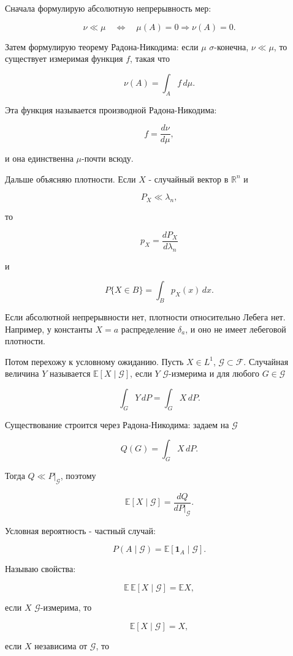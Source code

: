 \documentclass[
  11pt,
  a4paper,
]{article}
\begin{document}
Сначала формулирую абсолютную непрерывность мер:

\[
\nu\ll\mu
\quad\Longleftrightarrow\quad
\mu(A)=0\Rightarrow\nu(A)=0.
\]

Затем формулирую теорему Радона-Никодима: если \(\mu\)
\(\sigma\)-конечна, \(\nu\ll\mu\), то существует измеримая функция
\(f\), такая что

\[
\nu(A)=\int_A f\,d\mu.
\]

Эта функция называется производной Радона-Никодима:

\[
f=\frac{d\nu}{d\mu},
\]

и она единственна \(\mu\)-почти всюду.

Дальше объясняю плотности. Если \(X\) - случайный вектор в
\(\mathbb R^n\) и

\[
P_X\ll\lambda_n,
\]

то

\[
p_X=\frac{dP_X}{d\lambda_n}
\]

и

\[
P\{X\in B\}=\int_Bp_X(x)\,dx.
\]

Если абсолютной непрерывности нет, плотности относительно Лебега нет.
Например, у константы \(X=a\) распределение \(\delta_a\), и оно не имеет
лебеговой плотности.

Потом перехожу к условному ожиданию. Пусть \(X\in L^1\),
\(\mathcal G\subset\mathcal F\). Случайная величина \(Y\) называется
\(\mathbb E[X\mid\mathcal G]\), если \(Y\) \(\mathcal G\)-измерима и для
любого \(G\in\mathcal G\)

\[
\int_GY\,dP=\int_GX\,dP.
\]

Существование строится через Радона-Никодима: задаем на \(\mathcal G\)

\[
Q(G)=\int_GX\,dP.
\]

Тогда \(Q\ll P|_{\mathcal G}\), поэтому

\[
\mathbb E[X\mid\mathcal G]
=
\frac{dQ}{dP|_{\mathcal G}}.
\]

Условная вероятность - частный случай:

\[
P(A\mid\mathcal G)=\mathbb E[\mathbf 1_A\mid\mathcal G].
\]

Называю свойства:

\[
\mathbb E\,\mathbb E[X\mid\mathcal G]=\mathbb EX,
\]

если \(X\) \(\mathcal G\)-измерима, то

\[
\mathbb E[X\mid\mathcal G]=X,
\]

если \(X\) независима от \(\mathcal G\), то
\end{document}
